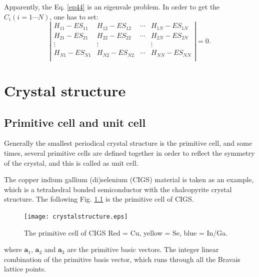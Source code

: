 \documentclass[a4paper, 12pt, titlepage,oneside,drop]{kthesis}
\begin{document}
\noindent Apparently, the Eq. \ref{ep44} is an eigenvale problem. In order to get the $C_{i} (i=1 \cdots N)$, one has to set:
\begin{equation}\label{ep4}
\left|
\begin{matrix}
    H_{11} - E S_{11} & H_{12} - E S_{12} & \cdots & H_{1N} - E S_{1N} \\
   H_{21} - E S_{21} & H_{22} - E S_{22} & \cdots & H_{2N} - E S_{2N} \\
    \vdots               & \vdots               &        & \vdots               \\
  H_{N1} - E S_{N1} & H_{N2} - E S_{N2} & \cdots & H_{NN} - E S_{NN} \\
\end{matrix} \right|
=0.
\end{equation}








\chapter{Crystal structure}
\label{ch:crystalstructure}



\section{Primitive cell and unit cell}
\noindent Generally the smallest periodical crystal structure is the primitive cell, and some times, several primitive cells are defined together
in order to reflect the symmetry of the crystal, and this is called as unit cell.

\noindent The copper indium gallium (di)selenium (CIGS) material is taken as an example, which is a tetrahedral bonded semiconductor with the
 chalcopyrite crystal structure. The following Fig. \ref{crystr} is the primitive cell of CIGS.
\begin{figure}[h]
\begin{center}
\texttt{[image: crystalstructure.eps]}
\caption{The primitive cell of CIGS Red = Cu, yellow = Se, blue = In/Ga. }
\label{crystr}
\end{center}

\end{figure}


\noindent where $\textbf{a}_{1}$, $\textbf{a}_{2}$ and  $\textbf{a}_{3}$ are the primitive basic vectors. The integer linear combination of the
primitive basis vector, which runs through all the Bravais lattice points.
\end{document}
